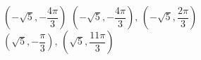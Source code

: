 { $\left( -\sqrt{5}, -\dfrac{4\pi}{3} \right)$}
{$\left( -\sqrt{5}, -\dfrac{4\pi}{3} \right), \, \left( -\sqrt{5}, \dfrac{2\pi}{3} \right)$\\$\left( \sqrt{5}, -\dfrac{\pi}{3} \right), \, \left(\sqrt{5}, \dfrac{11\pi}{3} \right)$\\
 }
